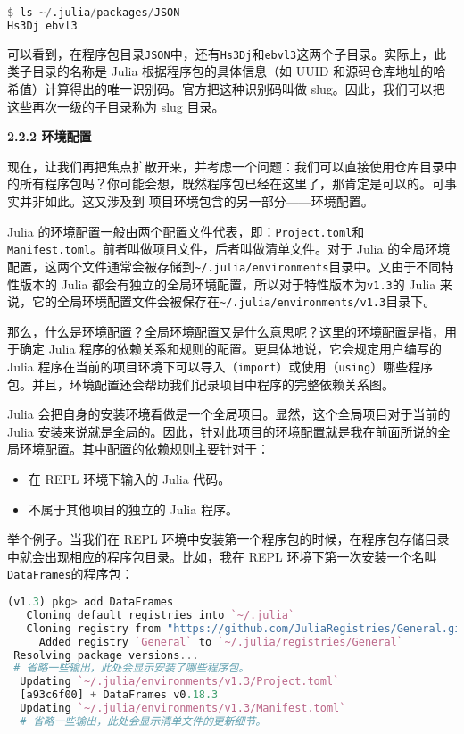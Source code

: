 \begin{lstlisting}[language=julia]
$ ls ~/.julia/packages/JSON
Hs3Dj ebvl3
\end{lstlisting}

可以看到，在程序包目录\verb`JSON`中，还有\verb`Hs3Dj`和\verb`ebvl3`这两个子目录。实际上，此类子目录的名称是 Julia 根据程序包的具体信息（如 UUID 和源码仓库地址的哈希值）计算得出的唯一识别码。官方把这种识别码叫做 slug。因此，我们可以把这些再次一级的子目录称为 slug 目录。

\textbf{2.2.2 环境配置}

现在，让我们再把焦点扩散开来，并考虑一个问题：我们可以直接使用仓库目录中的所有程序包吗？你可能会想，既然程序包已经在这里了，那肯定是可以的。可事实并非如此。这又涉及到 项目环境包含的另一部分——环境配置。

Julia 的环境配置一般由两个配置文件代表，即：\verb`Project.toml`和\verb`Manifest.toml`。前者叫做项目文件，后者叫做清单文件。对于 Julia 的全局环境配置，这两个文件通常会被存储到\verb`~/.julia/environments`目录中。又由于不同特性版本的 Julia 都会有独立的全局环境配置，所以对于特性版本为\verb`v1.3`的 Julia 来说，它的全局环境配置文件会被保存在\verb`~/.julia/environments/v1.3`目录下。

那么，什么是环境配置？全局环境配置又是什么意思呢？这里的环境配置是指，用于确定 Julia 程序的依赖关系和规则的配置。更具体地说，它会规定用户编写的 Julia 程序在当前的项目环境下可以导入（\verb`import`）或使用（\verb`using`）哪些程序包。并且，环境配置还会帮助我们记录项目中程序的完整依赖关系图。

Julia 会把自身的安装环境看做是一个全局项目。显然，这个全局项目对于当前的 Julia 安装来说就是全局的。因此，针对此项目的环境配置就是我在前面所说的全局环境配置。其中配置的依赖规则主要针对于：

\begin{itemize}
\item 在 REPL 环境下输入的 Julia 代码。
\item 不属于其他项目的独立的 Julia 程序。
\end{itemize}

举个例子。当我们在 REPL 环境中安装第一个程序包的时候，在程序包存储目录中就会出现相应的程序包目录。比如，我在 REPL 环境下第一次安装一个名叫\verb`DataFrames`的程序包：

\begin{lstlisting}[language=julia]
(v1.3) pkg> add DataFrames
   Cloning default registries into `~/.julia`
   Cloning registry from "https://github.com/JuliaRegistries/General.git"
     Added registry `General` to `~/.julia/registries/General`
 Resolving package versions...
 # 省略一些输出，此处会显示安装了哪些程序包。
  Updating `~/.julia/environments/v1.3/Project.toml`
  [a93c6f00] + DataFrames v0.18.3
  Updating `~/.julia/environments/v1.3/Manifest.toml`
  # 省略一些输出，此处会显示清单文件的更新细节。
\end{lstlisting}

